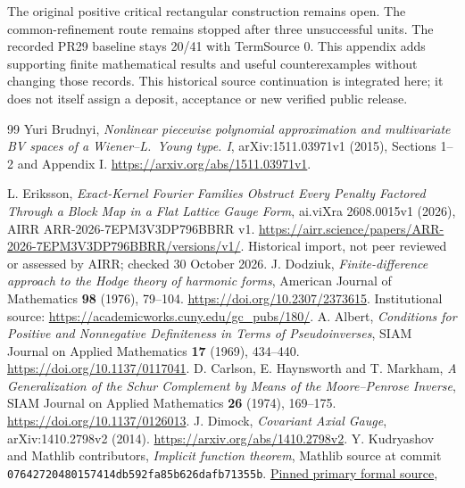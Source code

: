 \documentclass[11pt]{article}
\begin{document}
The original positive critical rectangular construction remains open.
The common-refinement route remains stopped after three unsuccessful units.
The recorded PR29 baseline stays 20/41 with TermSource 0. This appendix adds
supporting finite mathematical results and useful counterexamples without
changing those records. This historical source continuation is integrated here; it does not itself assign a deposit,
acceptance or new verified public release.











\begin{thebibliography}{99}
 Yuri Brudnyi, \emph{Nonlinear piecewise polynomial approximation and multivariate BV spaces of a Wiener--L.\ Young type. I}, arXiv:1511.03971v1 (2015), Sections 1--2 and Appendix I. \url{https://arxiv.org/abs/1511.03971v1}.
\small
\raggedright
{} L. Eriksson, \emph{Exact-Kernel Fourier Families Obstruct
Every Penalty Factored Through a Block Map in a Flat Lattice Gauge Form},
ai.viXra 2608.0015v1 (2026), AIRR ARR-2026-7EPM3V3DP796BBRR v1.
\url{https://airr.science/papers/ARR-2026-7EPM3V3DP796BBRR/versions/v1/}.
Historical import, not peer reviewed or assessed by AIRR; checked 30 October 2026.
 J. Dodziuk, \emph{Finite-difference approach to the Hodge
theory of harmonic forms}, American Journal of Mathematics \textbf{98}
(1976), 79--104. \url{https://doi.org/10.2307/2373615}.
Institutional source: \url{https://academicworks.cuny.edu/gc_pubs/180/}.
 A. Albert, \emph{Conditions for Positive and Nonnegative
Definiteness in Terms of Pseudoinverses}, SIAM Journal on Applied Mathematics
\textbf{17} (1969), 434--440. \url{https://doi.org/10.1137/0117041}.
 D. Carlson, E. Haynsworth and T. Markham,
\emph{A Generalization of the Schur Complement by Means of the Moore--Penrose
Inverse}, SIAM Journal on Applied Mathematics \textbf{26} (1974), 169--175.
\url{https://doi.org/10.1137/0126013}.
 J. Dimock, \emph{Covariant Axial Gauge},
arXiv:1410.2798v2 (2014). \url{https://arxiv.org/abs/1410.2798v2}.
 Y. Kudryashov and Mathlib contributors,
\emph{Implicit function theorem}, Mathlib source at commit
\texttt{07642720480157414db592fa85b626dafb71355b}.
\href{https://github.com/leanprover-community/mathlib4/blob/07642720480157414db592fa85b626dafb71355b/Mathlib/Analysis/Calculus/Implicit.lean}{Pinned primary formal source},

\end{thebibliography}
\end{document}
